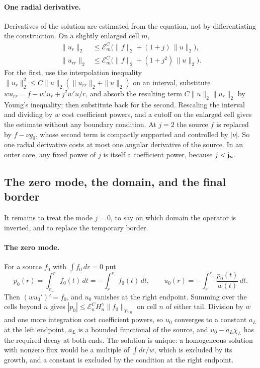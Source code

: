 \paragraph{One radial derivative.}
Derivatives of the solution are estimated from the equation, not by
differentiating the construction. On a slightly enlarged cell $m$,
\begin{equation}\label{eq:rad-eq-rm39}
 \begin{aligned}
 \|u_r\|_2&\le\mathcal E_m^C\bigl(\|f\|_2+(1+j)\,\|u\|_2\bigr),\\
 \|u_{rr}\|_2&\le\mathcal E_m^C\bigl(\|f\|_2+(1+j^2)\,\|u\|_2\bigr).
 \end{aligned}
\end{equation}
For the first, use the interpolation inequality
$\|u_r\|_2^2\le C\|u\|_2(\|u_{rr}\|_2+\|u\|_2)$ on an interval,
substitute $wu_{rr}=f-w'u_r+j^2w'u/r$, and absorb the resulting term
$C\|u\|_2\|u_r\|_2$ by Young's inequality; then substitute back for
the second. Rescaling the interval and dividing by $w$ cost
coefficient powers, and a cutoff on the enlarged cell gives the
estimate without any boundary condition. At $j=2$ the source $f$ is
replaced by $f-\nu g_0$, whose second term is compactly supported and
controlled by $|\nu|$. So one radial derivative costs at most one
angular derivative of the source. In an outer core, any fixed power of
$j$ is itself a coefficient power, because $j<\mathsf j_n$.

\subsection{The zero mode, the domain, and the final border}
\label{subsec:final-border}

It remains to treat the mode $j=0$, to say on which domain the
operator is inverted, and to replace the temporary border.

\paragraph{The zero mode.}
For a source $f_0$ with $\int f_0\,dr=0$ put
\begin{equation}\label{eq:rad-eq-rm49}
 p_0(r)=\int_{r_-}^r f_0(t)\,dt=-\int_r^{r_+}f_0(t)\,dt,\qquad
 u_0(r)=-\int_r^{r_+}\frac{p_0(t)}{w(t)}\,dt .
\end{equation}
Then $(wu_0')'=f_0$, and $u_0$ vanishes at the right endpoint. Summing
over the cells beyond $n$ gives
$|p_0|\le\mathcal E_n^CH_n^\gamma\|f_0\|_{Y_{\gamma,0}}$ on cell $n$ of
either tail. Division by $w$ and one more integration cost coefficient
powers, so $u_0$ converges to a constant $a_L$ at the left endpoint,
$a_L$ is a bounded functional of the source, and $u_0-a_L\chi_L$ has
the required decay at both ends. The solution is unique: a homogeneous
solution with nonzero flux would be a multiple of $\int dr/w$, which
is excluded by its growth, and a constant is excluded by the condition
at the right endpoint.

